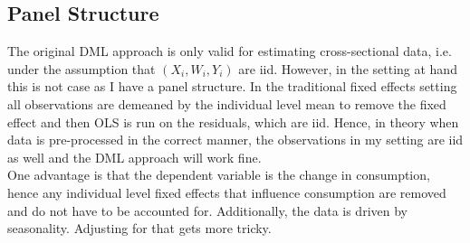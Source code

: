 \subsection*{Panel Structure}
The original DML approach is only valid for estimating cross-sectional data, i.e. under the assumption that $(X_{i}, W_{i}, Y_{i})$ are iid. However, in the setting at hand this is not case as I have a panel structure. In the traditional fixed effects setting all observations are demeaned by the individual level mean to remove the fixed effect and then OLS is run on the residuals, which are iid. Hence, in theory when data is pre-processed in the correct manner, the observations in my setting are iid as well and the DML approach will work fine. \\
One advantage is that the dependent variable is the change in consumption, hence any individual level fixed effects that influence consumption are removed and do not have to be accounted for. Additionally, the data is driven by seasonality. Adjusting for that gets more tricky. \\
